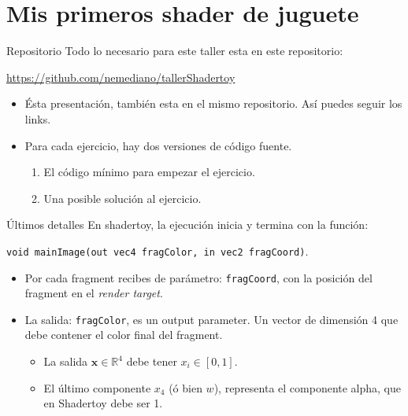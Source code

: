 \section{Mis primeros shader de juguete}
\begin{frame}{Repositorio}
Todo lo necesario para este taller esta en este repositorio: 
\begin{block}{}
\url{https://github.com/nemediano/tallerShadertoy}
\end{block}
\begin{itemize}
    \item Ésta presentación, también esta en el mismo repositorio. Así puedes seguir los links.
    \item Para cada ejercicio, hay dos versiones de código fuente.
    \begin{enumerate}
        \item El código mínimo para empezar el ejercicio.
        \item Una posible solución al ejercicio.
    \end{enumerate}
\end{itemize}

\end{frame}

\begin{frame}{Últimos detalles}
En shadertoy, la ejecución inicia y termina con la función:

\texttt{void mainImage(out vec4 fragColor, in vec2 fragCoord)}.

\begin{itemize}
    \item Por cada fragment recibes de parámetro: \texttt{fragCoord}, con la posición del fragment en el \emph{render target}.
    \item La salida: \texttt{fragColor}, es un output parameter. Un vector de dimensión 4 que debe contener el color final del fragment.
    \begin{itemize}
        \item La salida $\mathbf{x} \in \mathbb{R}^{4}$ debe tener $ x_i \in [0, 1]$.
        \item El último componente $x_4$ (ó bien $w$), representa el componente alpha, que en Shadertoy debe ser 1.
    \end{itemize}
\end{itemize}
\end{frame}

